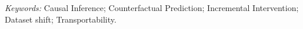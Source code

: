 \documentclass[12pt]{article}
\begin{document}
\noindent%
{\it Keywords:} Causal Inference; Counterfactual Prediction; Incremental Intervention; Dataset shift; Transportability.
\vfill

\newpage


 

\pagebreak





\pagebreak
\setcounter{page}{1}
\appendix


\end{document}
